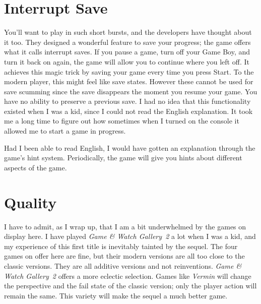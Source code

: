 \documentclass{book}
\begin{document}
\FloatBarrier\section*{Interrupt Save}
\FloatBarrier\vspace{\baselineskip}\centering
\begin{minipage}{0.45\linewidth}\end{minipage}\vspace{2pt}
\begin{minipage}{0.45\linewidth}\end{minipage}
\par\justifying
You’ll want to play in such short bursts, and the developers have thought about it too. They designed a wonderful feature to save your progress; the game offers what it calls interrupt saves. If you pause a game, turn off your Game Boy, and turn it back on again, the game will allow you to continue where you left off. It achieves this magic trick by saving your game every time you press Start. To the modern player, this might feel like save states. However these cannot be used for save scumming since the save disappears the moment you resume your game. You have no ability to preserve a previous save. I had no idea that this functionality existed when I was a kid, since I could not read the English explanation. It took me a long time to figure out how sometimes when I turned on the console it allowed me to start a game in progress.\par
Had I been able to read English, I would have gotten an explanation through the game’s hint system. Periodically, the game will give you hints about different aspects of the game.\par
\FloatBarrier\section*{Quality}
I have to admit, as I wrap up, that I am a bit underwhelmed by the games on display here. I have played \emph{Game \& Watch Gallery~2} a lot when I was a kid, and my experience of this first title is inevitably tainted by the sequel. The four games on offer here are fine, but their modern versions are all too close to the classic versions. They are all additive versions and not reinventions. \emph{Game \& Watch Gallery~2} offers a more eclectic selection. Games like \emph{Vermin} will change the perspective and the fail state of the classic version; only the player action will remain the same. This variety will make the sequel a much better game.\par
\end{document}
